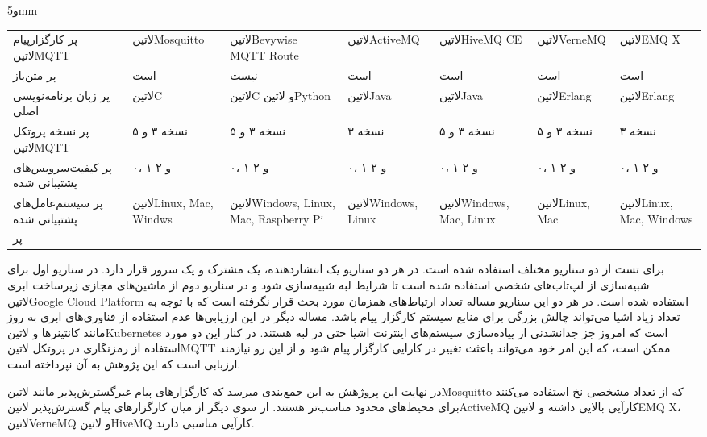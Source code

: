 ‌و{5mm}
\begin{tabularx}
  {\textwidth}
  {p{3cm}*6{X}}
‌پر
کارگزار‌پیام ‌لاتین{MQTT} & ‌لاتین{Mosquitto} & ‌لاتین{Bevywise MQTT Route} & ‌لاتین{ActiveMQ} & ‌لاتین{HiveMQ CE} & ‌لاتین{VerneMQ} & ‌لاتین{EMQ X} \\
‌پر
متن‌باز & است & نیست & است & است & است & است \\
‌پر
زبان برنامه‌نویسی اصلی & ‌لاتین{C} & ‌لاتین{C} و ‌لاتین{Python} & ‌لاتین{Java} & ‌لاتین{Java} & ‌لاتین{Erlang} & ‌لاتین{Erlang} \\
‌پر
نسخه پروتکل ‌لاتین{MQTT} & نسخه ۳ و ۵ & نسخه ۳ و ۵ & نسخه ۳ & نسخه ۳ و ۵ & نسخه ۳ و ۵ & نسخه ۳ \\
‌پر
کیفیت‌سرویس‌های پشتیبانی شده & ۰، ۱ و ۲ & ۰، ۱ و ۲ & ۰، ۱ و ۲ & ۰، ۱ و ۲ & ۰، ۱ و ۲ & ۰، ۱ و ۲ \\
‌پر
سیستم‌عامل‌های پشتبیانی شده & ‌لاتین{Linux, Mac, Windws} & ‌لاتین{Windows, Linux, Mac, Raspberry Pi} & ‌لاتین{Windows, Linux} & ‌لاتین{Windows, Mac, Linux} & ‌لاتین{Linux, Mac} & ‌لاتین{Linux, Mac, Windows} \\
‌پر
\end{tabularx}

برای تست از دو سناریو مختلف استفاده شده است. در هر دو سناریو یک انتشاردهنده، یک مشترک و یک سرور قرار دارد. در سناریو اول برای شبیه‌سازی از لپ‌تاب‌های شخصی استفاده شده است
تا شرایط لبه شبیه‌سازی شود و در سناریو دوم از ماشین‌های مجازی زیرساخت ابری ‌لاتین{Google Cloud Platform} استفاده شده است.
در هر دو این سناریو مساله تعداد ارتباط‌های همزمان مورد بحث قرار نگرفته است که با توجه به تعداد زیاد اشیا می‌تواند چالش بزرگی برای منابع سیستم کارگزار پیام باشد.
مساله دیگر در این ارزیابی‌ها عدم استفاده از فناوری‌های ابری به روز مانند کانتینرها و ‌لاتین{Kubernetes} است که امروز جز جدانشدنی از پیاده‌سازی سیستم‌های اینترنت اشیا حتی در لبه هستند.
در کنار این دو مورد استفاده از رمزنگاری در پروتکل ‌لاتین{MQTT} ممکن است، که این امر خود می‌تواند باعثث تغییر در کارایی کارگزار پیام شود و از این رو نیازمند ارزبابی است که این پژوهش به آن نپرداخته است.

در نهایت این پروژهش به این جمع‌بندی میرسد که کارگزار‌های پیام غیرگسترش‌پذیر مانند ‌لاتین{Mosquitto} که از تعداد مشخصی نخ استفاده می‌کنند برای محیط‌های محدود مناسب‌تر هستند.
از سوی دیگر از میان کارگزار‌های پیام گسترش‌پذیر ‌لاتین{ActiveMQ} کارآیی بالایی داشته و ‌لاتین{EMQ X}، ‌لاتین{VerneMQ} و ‌لاتین{HiveMQ} کارآیی مناسبی دارند.

